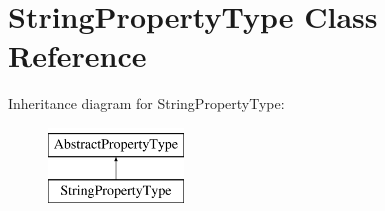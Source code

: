 \hypertarget{classStringPropertyType}{\section{String\-Property\-Type Class Reference}
\label{classStringPropertyType}
}
Inheritance diagram for String\-Property\-Type\-:\begin{figure}[H]
\begin{center}
\leavevmode
\includegraphics[height=2.000000cm]{classStringPropertyType}
\end{center}
\end{figure}
